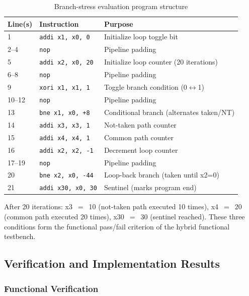 \documentclass[12pt,a4paper]{article}
\begin{document}
\begin{table}[htbp]
  \centering
  \caption{Branch-stress evaluation program structure}
  \label{tab:branchstress}
  \begin{tabular}{lll}
    \toprule
    \textbf{Line(s)} & \textbf{Instruction} & \textbf{Purpose} \\
    \midrule
    1         & \texttt{addi x1, x0, 0}  & Initialize loop toggle bit \\
    2--4      & \texttt{nop}              & Pipeline padding \\
    5         & \texttt{addi x2, x0, 20} & Initialize loop counter (20 iterations) \\
    6--8      & \texttt{nop}              & Pipeline padding \\
    9         & \texttt{xori x1, x1, 1}  & Toggle branch condition (0$\leftrightarrow$1) \\
    10--12    & \texttt{nop}              & Pipeline padding \\
    13        & \texttt{bne x1, x0, +8}  & Conditional branch (alternates taken/NT) \\
    14        & \texttt{addi x3, x3, 1}  & Not-taken path counter \\
    15        & \texttt{addi x4, x4, 1}  & Common path counter \\
    16        & \texttt{addi x2, x2, -1} & Decrement loop counter \\
    17--19    & \texttt{nop}              & Pipeline padding \\
    20        & \texttt{bne x2, x0, -44} & Loop-back branch (taken until x2=0) \\
    21        & \texttt{addi x30, x0, 30}& Sentinel (marks program end) \\
    \bottomrule
  \end{tabular}
\end{table}

After 20 iterations: x3~$=$~10 (not-taken path executed 10 times),
x4~$=$~20 (common path executed 20 times), x30~$=$~30 (sentinel reached).
These three conditions form the functional pass/fail criterion of the hybrid
functional testbench.

\subsection{Verification and Implementation Results}
\label{sec:results}

\subsubsection{Functional Verification}
\end{document}
